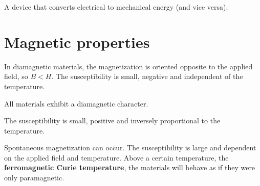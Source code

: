     \begin{example}[Transducer]
		A device that converts electrical to mechanical energy (and vice versa).
	\end{example}
    
\section{Magnetic properties}
	\begin{definition}[Diamagnetism]
    	In diamagnetic materials, the magnetization is oriented opposite to the applied field, so $B < H$. The susceptibility is small, negative and independent of the temperature.
	\end{definition}
    \begin{remark}
    	All materials exhibit a diamagnetic character.
	\end{remark}
        
	\begin{definition}[Paramagnetism]
    	The susceptibility is small, positive and inversely proportional to the temperature.
	\end{definition}
        
	\begin{definition}[Ferromagnetism]
    	Spontaneous magnetization can occur. The susceptibility is large and dependent on the applied field and temperature. Above a certain temperature, the \textbf{ferromagnetic Curie temperature}, the materials will behave as if they were only paramagnetic.
	\end{definition}
        
